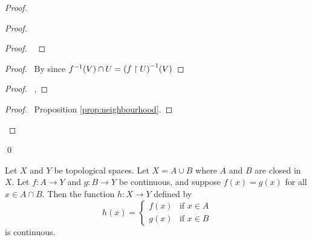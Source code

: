 \begin{proof}
  \pf
  \begin{proof}
    \begin{proof}
      \pf\ 
    \end{proof}
    \begin{proof}
      \pf\ By  since ${f}^{-1}(V) \cap U = {(f \restriction U)}^{-1}(V)$
    \end{proof}
    \begin{proof}
      \pf\ , 
    \end{proof}
    \qedstep
    \begin{proof}
      \pf\ Proposition \ref{prop:neighbourhood}.
    \end{proof}
  \end{proof}
  \qed
\end{proof}

\begin{prop}
  Let $X$ and $Y$ be topological spaces. Let $X = A \cup B$ where $A$ and $B$ are closed in $X$. Let $f : A \rightarrow Y$ and $g : B \rightarrow Y$ be continuous,
  and suppose $f(x) = g(x)$ for all $x \in A \cap B$. Then the function $h : X \rightarrow Y$ defined by
  \[ h(x) = \begin{cases}
  f(x) & \text{if } x \in A \\
  g(x) & \text{if } x \in B
\end{cases} \]
is continuous.
\end{prop}

